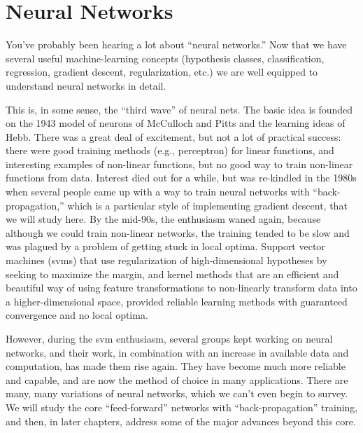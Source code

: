 \chapter{Neural Networks}
\label{chap-neural_networks}
You've probably been
hearing a lot about ``neural networks.''   Now that we have several
useful machine-learning concepts (hypothesis classes, classification,
regression,  gradient descent, regularization, etc.) we are
well equipped to understand neural networks in detail.

This is, in some sense, the ``third wave'' of neural nets.  The basic
idea is founded on the 1943 model of neurons of McCulloch and Pitts
and the learning ideas of Hebb.  There was a great deal of excitement, but
not a lot of practical success:  there were good training methods
(e.g., perceptron) for linear functions, and interesting examples of
non-linear functions, but no good way to train non-linear functions
from data.   Interest died out for a while,  but was re-kindled in the
1980s when several people  came up with a way to train neural networks with
``back-propagation,'' which is a particular style of implementing
gradient descent, that we will study here.  By the mid-90s, the
enthusiasm waned again, because although we could train non-linear
networks, the training tended to be slow and was plagued by a problem
of getting stuck in local optima.   Support vector machines ({\sc svm}s)
that use regularization of high-dimensional hypotheses by seeking to maximize
the margin, and kernel methods that are an efficient and beautiful way of
using feature transformations to non-linearly transform data into a
higher-dimensional space, provided reliable learning methods with
guaranteed convergence and no local optima.

However, during the {\sc svm} enthusiasm, several groups kept working
on neural networks, and their work, in combination with an increase in
available data and computation, has made them rise again.  They have
become much more reliable and capable, and are now the method of
choice in many applications.   There are many, many  variations of
neural networks, which we can't even begin to survey.  We will study
the core ``feed-forward'' networks with ``back-propagation''
training, and then, in later chapters, address some of the major
advances beyond this core.

